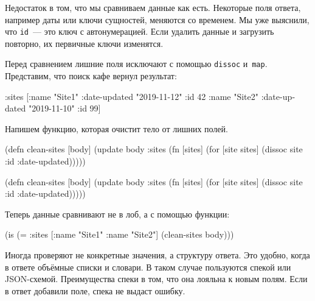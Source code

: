 \fi

\fi

Недостаток в том, что мы сравниваем данные как есть. Некоторые поля ответа,
например даты или ключи сущностей, меняются со временем. Мы уже выяснили, что
\verb|id|~--- это ключ с автонумерацией. Если удалить данные и загрузить
повторно, их первичные ключи изменятся.

Перед сравнением лишние поля исключают с помощью \verb|dissoc|
и~\verb|map|. Представим, что поиск кафе вернул результат:

\begin{english}
  \begin{clojure}
{:sites [{:name "Site1"
          :date-updated "2019-11-12"
          :id 42}
         {:name "Site2"
          :date-updated "2019-11-10"
          :id 99}]}
  \end{clojure}
\end{english}


\noindent
Напишем функцию, которая очистит тело от лишних полей.

\ifnarrow

\begin{english}
  \begin{clojure}
(defn clean-sites [body]
 (update body :sites
  (fn [sites]
   (for [site sites]
    (dissoc site :id :date-updated)))))
  \end{clojure}
\end{english}

\else

\begin{english}
  \begin{clojure}
(defn clean-sites [body]
  (update body :sites
          (fn [sites]
            (for [site sites]
              (dissoc site :id :date-updated)))))
  \end{clojure}
\end{english}

\fi

\noindent
Теперь данные сравнивают не в лоб, а с помощью функции:

\begin{english}
  \begin{clojure}
(is (= {:sites [{:name "Site1"}
                {:name "Site2"}]}
       (clean-sites body)))
  \end{clojure}
\end{english}

Иногда проверяют не конкретные значения, а структуру ответа. Это удобно, когда в
ответе объёмные списки и словари. В таком случае пользуются спекой или
JSON-схемой. Преимущества спеки в том, что она лояльна к новым полям. Если в
ответ добавили поле, спека не выдаст ошибку.

